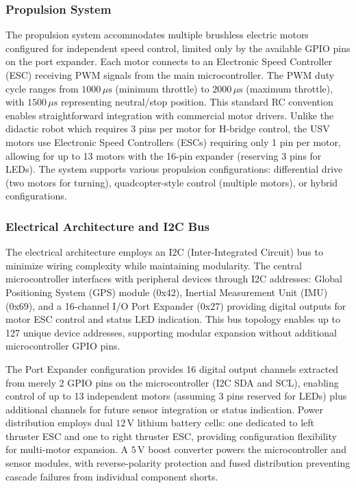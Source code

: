 \documentclass[conference]{IEEEtran}
\begin{document}
\subsubsection{Propulsion System}
The propulsion system accommodates multiple brushless electric motors configured for independent speed control, limited only by the available GPIO pins on the port expander. Each motor connects to an Electronic Speed Controller (ESC) receiving PWM signals from the main microcontroller. The PWM duty cycle ranges from $1000 \, \mu \mathrm{s}$ (minimum throttle) to $2000 \, \mu \mathrm{s}$ (maximum throttle), with $1500 \, \mu \mathrm{s}$ representing neutral/stop position. This standard RC convention enables straightforward integration with commercial motor drivers. Unlike the didactic robot which requires 3 pins per motor for H-bridge control, the USV motors use Electronic Speed Controllers (ESCs) requiring only 1 pin per motor, allowing for up to 13 motors with the 16-pin expander (reserving 3 pins for LEDs). The system supports various propulsion configurations: differential drive (two motors for turning), quadcopter-style control (multiple motors), or hybrid configurations.

\subsubsection{Electrical Architecture and I2C Bus}
The electrical architecture employs an I2C (Inter-Integrated Circuit) bus to minimize wiring complexity while maintaining modularity. The central microcontroller interfaces with peripheral devices through I2C addresses: Global Positioning System (GPS) module (0x42), Inertial Measurement Unit (IMU) (0x69), and a 16-channel I/O Port Expander (0x27) providing digital outputs for motor ESC control and status LED indication. This bus topology enables up to 127 unique device addresses, supporting modular expansion without additional microcontroller GPIO pins.

The Port Expander configuration provides 16 digital output channels extracted from merely 2 GPIO pins on the microcontroller (I2C SDA and SCL), enabling control of up to 13 independent motors (assuming 3 pins reserved for LEDs) plus additional channels for future sensor integration or status indication. Power distribution employs dual $12 \, \mathrm{V}$ lithium battery cells: one dedicated to left thruster ESC and one to right thruster ESC, providing configuration flexibility for multi-motor expansion. A $5 \, \mathrm{V}$ boost converter powers the microcontroller and sensor modules, with reverse-polarity protection and fused distribution preventing cascade failures from individual component shorts.
\end{document}
